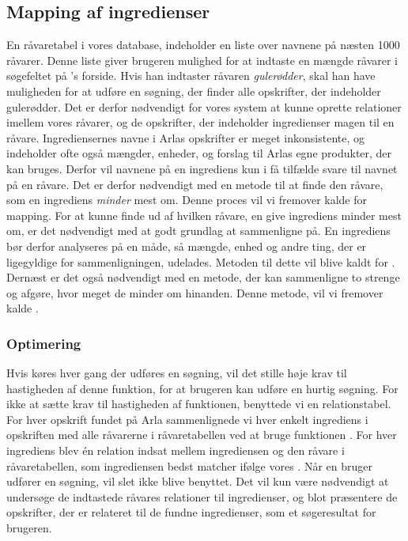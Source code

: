 \subsection{Mapping af ingredienser}
\label{sec:mapping}
En råvaretabel i vores database, indeholder en liste over navnene på næsten 1000 råvarer. Denne liste giver brugeren mulighed for at indtaste en mængde råvarer i søgefeltet på {\Foodl}'s forside. Hvis han indtaster råvaren \textit{gulerødder}, skal han have muligheden for at udføre en søgning, der finder alle opskrifter, der indeholder gulerødder. Det er derfor nødvendigt for vores system at kunne oprette relationer imellem vores råvarer, og de opskrifter, der indeholder ingredienser magen til en råvare. Ingrediensernes navne i Arlas opskrifter er meget inkonsistente, og indeholder ofte også mængder, enheder, og forslag til Arlas egne produkter, der kan bruges. Derfor vil navnene på en ingrediens kun i få tilfælde svare til navnet på en råvare. Det er derfor nødvendigt med en metode til at finde den råvare, som en ingrediens \textit{minder} mest om. Denne proces vil vi fremover kalde for mapping. For at kunne finde ud af hvilken råvare, en give ingrediens minder mest om, er det nødvendigt med at godt grundlag at sammenligne på. En ingrediens bør derfor analyseres på en måde, så mængde, enhed og andre ting, der er ligegyldige for sammenligningen, udelades. Metoden til dette vil blive kaldt for . Dernæst er det også nødvendigt med en metode, der kan sammenligne to strenge og afgøre, hvor meget de minder om hinanden. Denne metode, vil vi fremover kalde .

\subsubsection{Optimering}
Hvis  køres hver gang der udføres en søgning, vil det stille høje krav til hastigheden af denne funktion, for at brugeren kan udføre en hurtig søgning. For ikke at sætte krav til hastigheden af funktionen, benyttede vi en relationstabel. For hver opskrift fundet på Arla sammenlignede vi hver enkelt ingrediens i opskriften med alle råvarerne i råvaretabellen ved at bruge funktionen . For hver ingrediens blev én relation indsat mellem ingrediensen og den råvare i råvaretabellen, som ingrediensen bedst matcher ifølge vores . Når en bruger udfører en søgning, vil  slet ikke blive benyttet. Det vil kun være nødvendigt at undersøge de indtastede råvares relationer til ingredienser, og blot præsentere de opskrifter, der er relateret til de fundne ingredienser, som et søgeresultat for brugeren.

